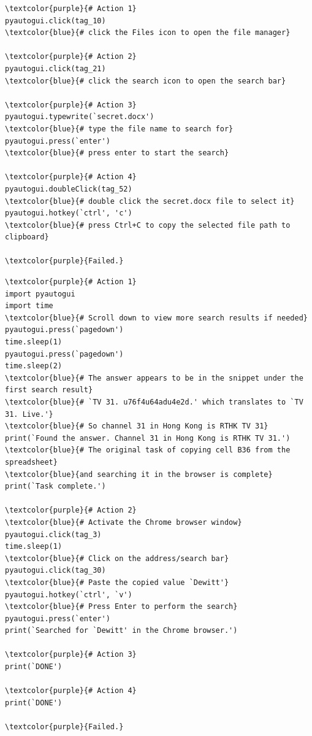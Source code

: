 \begin{tcolorbox}[title={Claude3 Failed Task1: \textit{I remember there is a file named "secret.docx" on this computer, but I can't remember where it is. Please find the path where this file is stored and copy it to the clipboard.}}]

\begin{Verbatim}[commandchars=\\\{\}]
\textcolor{purple}{# Action 1}
pyautogui.click(tag_10) 
\textcolor{blue}{# click the Files icon to open the file manager}

\textcolor{purple}{# Action 2}
pyautogui.click(tag_21) 
\textcolor{blue}{# click the search icon to open the search bar}

\textcolor{purple}{# Action 3}
pyautogui.typewrite(`secret.docx') 
\textcolor{blue}{# type the file name to search for}
pyautogui.press(`enter') 
\textcolor{blue}{# press enter to start the search}

\textcolor{purple}{# Action 4}
pyautogui.doubleClick(tag_52) 
\textcolor{blue}{# double click the secret.docx file to select it}
pyautogui.hotkey(`ctrl', 'c') 
\textcolor{blue}{# press Ctrl+C to copy the selected file path to clipboard}

\textcolor{purple}{Failed.}
\end{Verbatim}
\end{tcolorbox}


\begin{tcolorbox}[title={Claude3 Failed Task2: \textit{copy the data in Cell B6 in this Libreoffice Calc file and search it in the Chrome browser.}}]

\begin{Verbatim}[commandchars=\\\{\}]
\textcolor{purple}{# Action 1}
import pyautogui
import time
\textcolor{blue}{# Scroll down to view more search results if needed}
pyautogui.press(`pagedown')
time.sleep(1)
pyautogui.press(`pagedown') 
time.sleep(2)
\textcolor{blue}{# The answer appears to be in the snippet under the first search result}
\textcolor{blue}{# `TV 31. u76f4u64adu4e2d.' which translates to `TV 31. Live.'}
\textcolor{blue}{# So channel 31 in Hong Kong is RTHK TV 31}
print(`Found the answer. Channel 31 in Hong Kong is RTHK TV 31.')
\textcolor{blue}{# The original task of copying cell B36 from the spreadsheet}
\textcolor{blue}{and searching it in the browser is complete}
print(`Task complete.')

\textcolor{purple}{# Action 2}
\textcolor{blue}{# Activate the Chrome browser window}
pyautogui.click(tag_3)
time.sleep(1)
\textcolor{blue}{# Click on the address/search bar}
pyautogui.click(tag_30)
\textcolor{blue}{# Paste the copied value `Dewitt'}
pyautogui.hotkey(`ctrl', `v')
\textcolor{blue}{# Press Enter to perform the search}
pyautogui.press(`enter')
print(`Searched for `Dewitt' in the Chrome browser.')

\textcolor{purple}{# Action 3}
print(`DONE')

\textcolor{purple}{# Action 4}
print(`DONE')

\textcolor{purple}{Failed.}
\end{Verbatim}
\end{tcolorbox}

